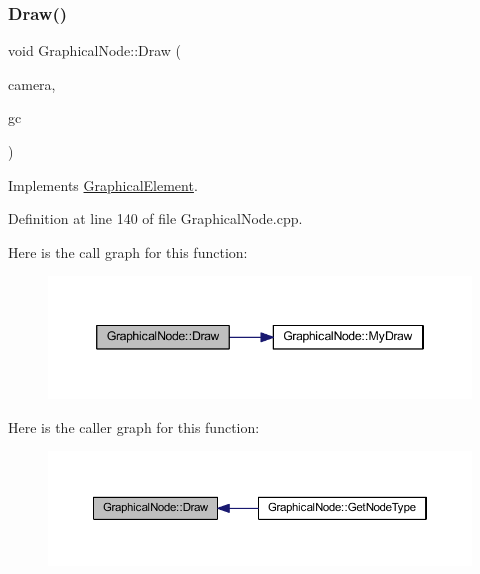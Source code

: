 \subsubsection{\texorpdfstring{Draw()}{Draw()}}
{\footnotesize\ttfamily void Graphical\+Node\+::\+Draw (\begin{DoxyParamCaption}\item[{const wx\+Affine\+Matrix2D \&}]{camera,  }\item[{wx\+Graphics\+Context $\ast$}]{gc }\end{DoxyParamCaption})\hspace{0.3cm}{\ttfamily [virtual]}}



Implements \hyperlink{class_graphical_element_ab137d6d3ad82fd08b5610519dda0c600}{Graphical\+Element}.



Definition at line 140 of file Graphical\+Node.\+cpp.

Here is the call graph for this function\+:
\nopagebreak
\begin{figure}[H]
\begin{center}
\leavevmode
\includegraphics[width=346pt]{class_graphical_node_a5675edef9951820c61973cd8fb242287_cgraph}
\end{center}
\end{figure}
Here is the caller graph for this function\+:
\nopagebreak
\begin{figure}[H]
\begin{center}
\leavevmode
\includegraphics[width=350pt]{class_graphical_node_a5675edef9951820c61973cd8fb242287_icgraph}
\end{center}
\end{figure}
\mbox{\label{class_graphical_node_a29991fc9117db0975aa1a61d0df48822}} 
